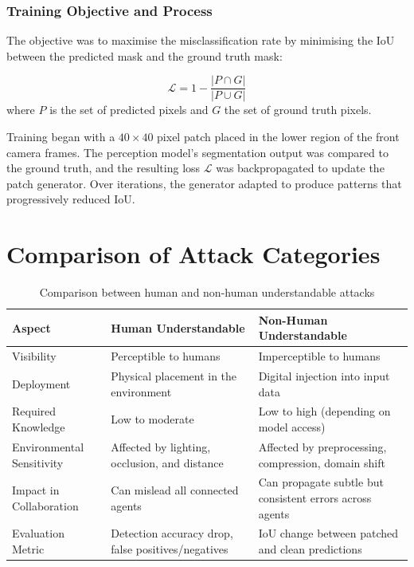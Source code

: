 \subsubsection{Training Objective and Process}

The objective was to maximise the misclassification rate by minimising the IoU between the predicted mask and the ground truth mask:

\[
    \mathcal{L} = 1 - \frac{|P \cap G|}{|P \cup G|}
\]
where \(P\) is the set of predicted pixels and \(G\) the set of ground truth pixels.

Training began with a \(40 \times 40\) pixel patch placed in the lower region of the front camera frames.
The perception model’s segmentation output was compared to the ground truth, and the resulting loss \(\mathcal{L}\) was backpropagated to update the patch generator.
Over iterations, the generator adapted to produce patterns that progressively reduced IoU.

\section{Comparison of Attack Categories}

\begin{table}[h!]
    \centering
    \caption{Comparison between human and non-human understandable attacks}
    \begin{tabular}{p{2.5cm}p{5.5cm}p{5.5cm}}
        \toprule
        \textbf{Aspect}           & \textbf{Human Understandable}                      & \textbf{Non-Human Understandable}                        \\
        \midrule
        Visibility                & Perceptible to humans                              & Imperceptible to humans                                  \\
        Deployment                & Physical placement in the environment              & Digital injection into input data                        \\
        Required Knowledge        & Low to moderate                                    & Low to high (depending on model access)                  \\
        Environmental Sensitivity & Affected by lighting, occlusion, and distance      & Affected by preprocessing, compression, domain shift     \\
        Impact in Collaboration   & Can mislead all connected agents                   & Can propagate subtle but consistent errors across agents \\
        Evaluation Metric         & Detection accuracy drop, false positives/negatives & IoU change between patched and clean predictions         \\
        \bottomrule
    \end{tabular}
\end{table}